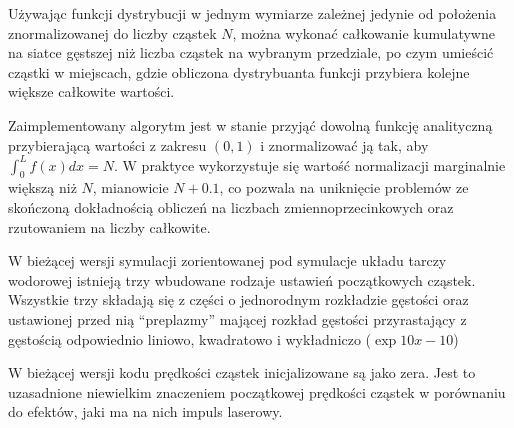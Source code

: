 Używając funkcji dystrybucji w jednym wymiarze zależnej jedynie od
położenia znormalizowanej do liczby cząstek $N$, można wykonać całkowanie
kumulatywne na siatce gęstszej niż liczba cząstek na wybranym przedziale,
po czym umieścić cząstki w miejscach, gdzie obliczona dystrybuanta funkcji
 przybiera kolejne większe całkowite wartości.


Zaimplementowany algorytm jest w stanie przyjąć dowolną funkcję analityczną
przybierającą  wartości z zakresu $(0, 1)$
i znormalizować ją tak, aby $\int_0^L
f(x) dx = N$. W praktyce wykorzystuje się wartość normalizacji marginalnie
większą niż $N$, mianowicie $N+0.1$, co pozwala na uniknięcie problemów ze
skończoną dokładnością obliczeń na liczbach zmiennoprzecinkowych oraz
rzutowaniem na liczby całkowite.

W bieżącej wersji symulacji zorientowanej pod symulacje układu tarczy
wodorowej istnieją trzy wbudowane rodzaje ustawień początkowych cząstek.
Wszystkie trzy składają się z części o jednorodnym rozkładzie gęstości oraz
ustawionej przed nią ``preplazmy'' mającej rozkład gęstości przyrastający z
gęstością odpowiednio liniowo, kwadratowo i wykładniczo ($\exp{10 x - 10}$)


W bieżącej wersji kodu prędkości cząstek inicjalizowane są jako zera. Jest to
uzasadnione niewielkim znaczeniem początkowej prędkości cząstek w
porównaniu do efektów, jaki ma na nich impuls laserowy.




